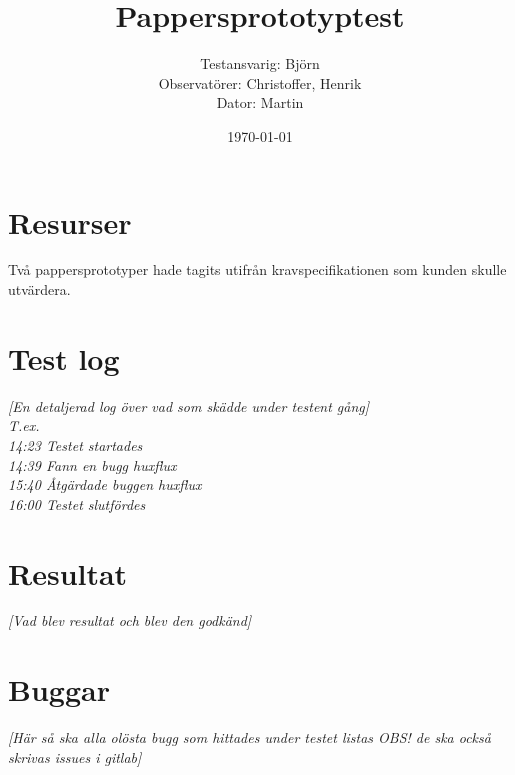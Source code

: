 \documentclass[a4paper,10pt, twoside]{article}
\title{Pappersprototyptest}
\author{Testansvarig: Björn\\Observatörer: Christoffer, Henrik\\ Dator: Martin}
\date{\today}
\begin{document}
\maketitle\clearpage

\section{Resurser}
Två pappersprototyper hade tagits utifrån kravspecifikationen som kunden skulle utvärdera.

\section{Test log}
\emph{[En detaljerad log över vad som skädde under testent gång]\\
T.ex. \\ 14:23 Testet startades \\ 14:39 Fann en bugg huxflux \\ 15:40 Åtgärdade buggen huxflux \\ 16:00 Testet slutfördes}
\

\section{Resultat}
\emph{[Vad blev resultat och blev den godkänd]}

\section{Buggar}
\emph{[Här så ska alla olösta bugg som hittades under testet listas OBS! de ska också skrivas issues i gitlab]}
\end{document}
